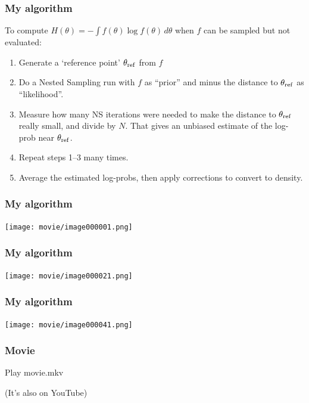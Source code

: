 \documentclass{beamer}
\begin{document}
\begin{frame}
\frametitle{My algorithm}
To compute $H(\theta) = -\int f(\theta) \log f(\theta) \, d\theta$
when $f$ can be sampled but not evaluated:

\begin{enumerate}
  \item<2-> Generate a `reference point' $\theta_{\rm ref}$ from $f$
  \item<3-> Do a Nested Sampling run with $f$ as ``prior'' and
            minus the distance to $\theta_{\rm ref}$ as
            ``likelihood''.
  \item<4-> Measure how many NS iterations were needed to make the
            distance to $\theta_{\rm ref}$ really small, and divide
            by $N$. That gives an
            unbiased estimate of the
            log-prob near $\theta_{\rm ref}$.
  \item<5-> Repeat steps 1--3 many times.
  \item<6-> Average the estimated log-probs, then apply corrections
            to convert to density.
\end{enumerate}
\end{frame}


\begin{frame}
\frametitle{My algorithm}

\begin{center}
\texttt{[image: movie/image000001.png]}
\end{center}

\end{frame}



\begin{frame}
\frametitle{My algorithm}

\begin{center}
\texttt{[image: movie/image000021.png]}
\end{center}

\end{frame}



\begin{frame}
\frametitle{My algorithm}

\begin{center}
\texttt{[image: movie/image000041.png]}
\end{center}

\end{frame}


\begin{frame}
\frametitle{Movie}

Play movie.mkv

(It's also on YouTube)

\end{frame}
\end{document}
